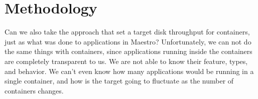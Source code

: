 \documentclass[10pt, conference,compsoc]{IEEEtran}
\begin{document}




\section{Methodology}
Can we also take the approach that set a target disk throughput for containers, just as what was done to applications in Maestro? Unfortunately, we can not do the same things with containers, since applications running inside the containers are completely transparent to us. We are not able to know their feature, types, and behavior. We can't even know how many applications would be running in a single container, and how is the target going to fluctuate as the number of containers changes.\\
\end{document}
